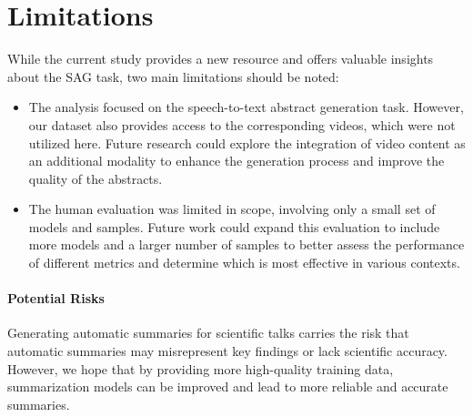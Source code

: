 \section{Limitations}\label{sec:limitaitons}
While the current study provides a new resource and offers valuable insights about the SAG task, two main limitations should be noted:

\begin{itemize} 
\item The analysis focused on the 
speech-to-text abstract generation task. However, our dataset also provides 
access to the corresponding videos, which were not utilized here. Future research could explore the integration of video content as an additional modality to enhance the generation process and improve the quality of the abstracts. 
\item The human evaluation was limited in scope, involving only a small set of models and samples. Future work could expand this evaluation to include more models and a larger number of samples to better assess the performance of different metrics and determine which is most effective in various contexts. 
\end{itemize}

\paragraph{Potential Risks} 
Generating automatic summaries for scientific talks carries the risk that automatic summaries may misrepresent key findings or lack scientific accuracy. However, we hope that by providing more high-quality training data, summarization models can be improved and lead to more reliable and accurate summaries.